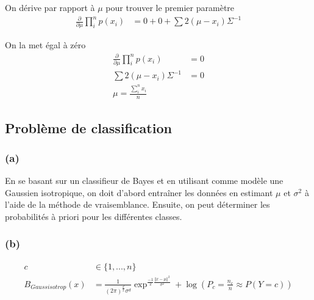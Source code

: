 \documentclass{article}
\begin{document}
	On dérive par rapport à $\mu$ pour trouver le premier paramètre
		\begin{equation}
		\begin{split}
		\frac{\partial}{\partial \mu}\prod_{i}^{n} p(x_{i}) &= 0 + 0 + \sum 2(\mu - x_{i}) \Sigma^{-1}	 
		\end{split}
		\end{equation}	
		
	On la met égal à zéro
		\begin{equation}
		\begin{split}
		\frac{\partial}{\partial \mu}\prod_{i}^{n} p(x_{i}) &= 0 \\
		\sum 2(\mu - x_{i}) \Sigma^{-1} &= 0 \\
		\mu = \frac{\sum_{i}^{n} x_{i}}{n}
		\end{split}
		\end{equation}		
	
	\subsection{Problème de classification}
		
	\subsubsection*{(a)}
	En se basant sur un classifieur de Bayes et en utilisant comme modèle une Gaussien isotropique, on doit d'abord entraîner les données en estimant $\mu$ et $\sigma^2$ à l'aide de la méthode de vraisemblance.
	Ensuite, on peut déterminer les probabilités à priori pour les différentes classes.
		
	\subsubsection*{(b)}
	\begin{equation}
	\begin{split}
	c &\in \{1, ... , n\} \\
	B_{Gaussisotrop}(x) &= 
	\frac{1}{(2\pi)^{\frac{d}{2}}\sigma^d}\exp^{\frac{-1}{2}\frac{\Vert x-\mu\Vert^2}{\sigma^2}} + \log(P_c = \frac{n_c}{n} \approx P(Y = c))
	\end{split}
	\end{equation}
	
\end{document}
